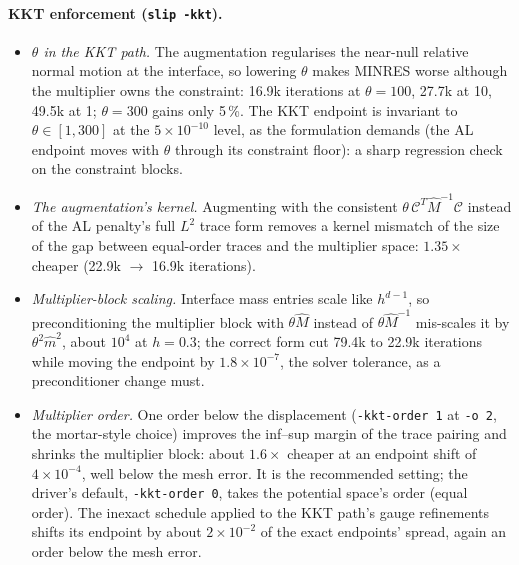 \documentclass[11pt]{article}
\numberwithin{equation}{section}
\newcommand{\code}[1]{\texttt{#1}}
\begin{document}
\paragraph{KKT enforcement (\code{slip -kkt}).}
\begin{itemize}[leftmargin=*]
\item \emph{$\theta$ in the KKT path.} The augmentation regularises the
  near-null relative normal motion at the interface, so lowering $\theta$
  makes MINRES worse although the multiplier owns the constraint:
  16.9k iterations at $\theta=100$, 27.7k at 10, 49.5k at 1; $\theta=300$
  gains only 5\,\%. The KKT endpoint is invariant to $\theta\in[1,300]$ at
  the $5\times10^{-10}$ level, as the formulation demands (the AL endpoint
  moves with $\theta$ through its constraint floor): a sharp regression
  check on the constraint blocks.
\item \emph{The augmentation's kernel.} Augmenting with the consistent
  $\theta\,\mathcal{C}^T\hat M^{-1}\mathcal{C}$ instead of the AL penalty's
  full $L^2$ trace form removes a kernel mismatch of the size of the gap
  between equal-order traces and the multiplier space: $1.35\times$ cheaper
  (22.9k $\to$ 16.9k iterations).
\item \emph{Multiplier-block scaling.} Interface mass entries scale like
  $h^{d-1}$, so preconditioning the multiplier block with $\theta\hat M$
  instead of $\theta\hat M^{-1}$ mis-scales it by $\theta^2\hat m^2$, about
  $10^4$ at $h=0.3$; the correct form cut 79.4k to 22.9k iterations while
  moving the endpoint by $1.8\times10^{-7}$, the solver tolerance, as a
  preconditioner change must.
\item \emph{Multiplier order.} One order below the displacement
  (\code{-kkt-order 1} at \code{-o 2}, the mortar-style choice) improves the
  inf--sup margin of the trace pairing and shrinks the multiplier block:
  about $1.6\times$ cheaper at an endpoint shift of $4\times10^{-4}$, well
  below the mesh error. It is the recommended setting; the driver's default,
  \code{-kkt-order 0}, takes the potential space's order (equal order). The
  inexact schedule applied to the KKT path's gauge refinements shifts its
  endpoint by about $2\times10^{-2}$ of the exact endpoints' spread, again
  an order below the mesh error.
\end{itemize}
\end{document}
